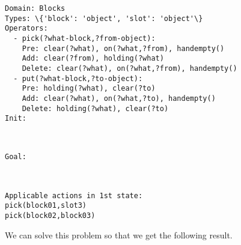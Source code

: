 \documentclass[11pt]{article}
\begin{document}
    \begin{Verbatim}[commandchars=\\\{\}]
Domain: Blocks
Types: \{'block': 'object', 'slot': 'object'\}
Operators:
  - pick(?what-block,?from-object):
    Pre: clear(?what), on(?what,?from), handempty()
    Add: clear(?from), holding(?what)
    Delete: clear(?what), on(?what,?from), handempty()
  - put(?what-block,?to-object):
    Pre: holding(?what), clear(?to)
    Add: clear(?what), on(?what,?to), handempty()
    Delete: holding(?what), clear(?to)
Init:

    \end{Verbatim}

    \begin{center}
    \end{center}
    { \hspace*{\fill} \\}
    
    \begin{Verbatim}[commandchars=\\\{\}]
Goal:

    \end{Verbatim}

    \begin{center}
    \end{center}
    { \hspace*{\fill} \\}
    
    \begin{Verbatim}[commandchars=\\\{\}]
Applicable actions in 1st state:
pick(block01,slot3)
pick(block02,block03)

    \end{Verbatim}

    We can solve this problem so that we get the following result.
\end{document}
